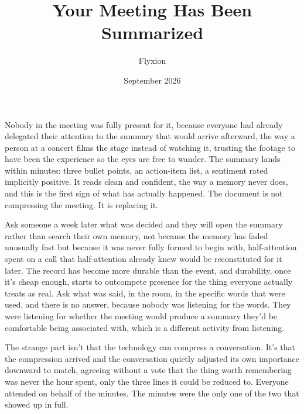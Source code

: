 \documentclass[11pt]{article}
\title{Your Meeting Has Been Summarized}
\author{Flyxion}
\date{September 2026}
\begin{document}
\maketitle

Nobody in the meeting was fully present for it, because everyone had already delegated their attention to the summary that would arrive afterward, the way a person at a concert films the stage instead of watching it, trusting the footage to have been the experience so the eyes are free to wander. The summary lands within minutes: three bullet points, an action-item list, a sentiment rated implicitly positive. It reads clean and confident, the way a memory never does, and this is the first sign of what has actually happened. The document is not compressing the meeting. It is replacing it.

Ask someone a week later what was decided and they will open the summary rather than search their own memory, not because the memory has faded unusually fast but because it was never fully formed to begin with, half-attention spent on a call that half-attention already knew would be reconstituted for it later. The record has become more durable than the event, and durability, once it's cheap enough, starts to outcompete presence for the thing everyone actually treats as real. Ask what was said, in the room, in the specific words that were used, and there is no answer, because nobody was listening for the words. They were listening for whether the meeting would produce a summary they'd be comfortable being associated with, which is a different activity from listening.

The strange part isn't that the technology can compress a conversation. It's that the compression arrived and the conversation quietly adjusted its own importance downward to match, agreeing without a vote that the thing worth remembering was never the hour spent, only the three lines it could be reduced to. Everyone attended on behalf of the minutes. The minutes were the only one of the two that showed up in full.
\end{document}
